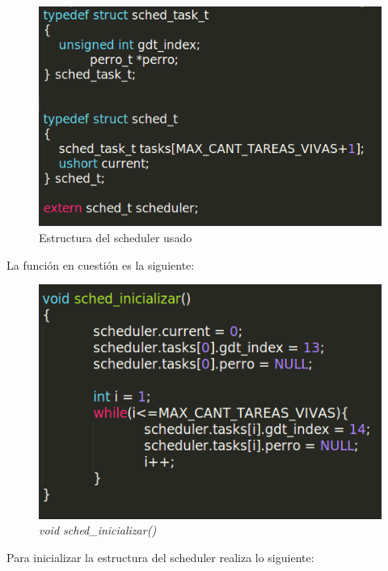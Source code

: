 \begin{figure}[H]
\begin{center}
 \includegraphics[width=\linewidth]{ejercicio7/sched.png}
 \caption{{\small Estructura del scheduler usado} }
\endminipage
\end{center}
\end{figure}

La función en cuestión es la siguiente:

\begin{figure}[H]
\begin{center}
\includegraphics[width=\linewidth]{ejercicio7/funcion.png}
\caption{{\small \textit{void sched\_inicializar()} }}
\endminipage
\end{center}
\end{figure}

Para inicializar la estructura del scheduler realiza lo siguiente:

